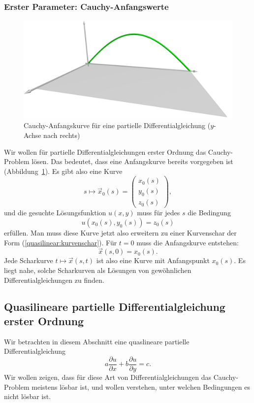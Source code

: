 \subsubsection{Erster Parameter: Cauchy-Anfangswerte}
\begin{figure}
\begin{center}
\includegraphics[width=\hsize]{../common/3d/cauchy.jpg}
\end{center}
\caption{Cauchy-Anfangskurve für eine partielle Differentialgleichung
($y$-Achse nach rechts)
\label{geometrie:cauchy-anfangskurve}}
\end{figure}
Wir wollen für partielle Differentialgleichungen erster Ordnung
das Cauchy-Problem lösen.
Das bedeutet, dass eine Anfangskurve bereits vorgegeben ist
(Abbildung~\ref{geometrie:cauchy-anfangskurve}).
Es gibt also eine Kurve
\begin{equation}
s\mapsto\vec x_0(s)=\begin{pmatrix}
x_0(s)\\
y_0(s)\\
z_0(s)
\end{pmatrix},
\label{quasilinear:anfangskurve}
\end{equation}
und die gesuchte Lösungsfunktion $u(x,y)$ muss für jedes $s$ die
Bedingung
\[
u(x_0(s), y_0(s))=z_0(s)
\]
erfüllen.
Man muss diese Kurve jetzt also erweitern zu einer Kurvenschar
der Form (\ref{quasilinear:kurvenschar}).
Für $t=0$ muss die Anfangskurve entstehen:
\[
\vec x(s,0)=x_0(s).
\]
Jede Scharkurve $t\mapsto \vec x(s,t)$ ist also eine Kurve
mit Anfangspunkt $x_0(s)$.
Es liegt nahe, solche Scharkurven als Lösungen von gewöhnlichen
Differentialgleichungen zu finden.

\subsection{Quasilineare partielle Differentialgleichung erster Ordnung}
Wir betrachten in diesem Abschnitt eine quaslineare partielle 
Differentialgleichung
\begin{equation}
a\frac{\partial u}{\partial x}
+
b\frac{\partial u}{\partial y}
=
c.
\label{quasilinear:equation}
\end{equation}
Wir wollen zeigen, dass für diese Art von Differentialgleichungen
das Cauchy-Problem meistens lösbar ist, und wollen verstehen,
unter welchen Bedingungen es nicht lösbar ist.

